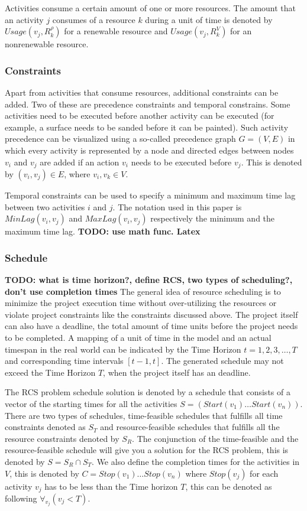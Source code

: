 \documentclass{article}
\newcommand{\TODO}[1]{{\color{red}\textbf{TODO: #1}}}
\begin{document}
Activities consume a certain amount of one or more resources.
The amount that an activity $j$ consumes of a resource $k$ during a unit of time is denoted by $Usage(v_j, R^{\rho}_k)$ for a renewable resource and   $Usage(v_j, R^V_k)$ for an nonrenewable resource.


\subsubsection{Constraints}
Apart from activities that consume resources, additional constraints can be added.
Two of these are precedence constraints and temporal constrains.
Some activities need to be executed before another activity can be executed (for example, a surface needs to be sanded before it can be painted).
Such activity precedence can be visualized using a so-called precedence graph $G = (V, E)$ in which every activity is represented by a node and directed edges between nodes $v_i$ and $v_j$ are added if an action $v_i$ needs to be executed before $v_j$.
This is denoted by $(v_i,v_j) \in E$, where $v_i, v_k \in V$.

Temporal constraints can be used to specify a minimum and maximum time lag between two activities $i$ and $j$.
The notation used in this paper is $MinLag(v_i, v_j)$ and $MaxLag(v_i, v_j)$ respectively the minimum and the maximum time lag.
\TODO{use math func. Latex}

\subsubsection{Schedule}
\TODO{what is time horizon?, define RCS, two types of scheduling?, don't use completion times}
The general idea of resource scheduling is to minimize the project execution time without over-utilizing the resources or violate project constraints like the constraints discussed above.
The project itself can also have a deadline, the total amount of time units before the project needs to be completed.
A mapping of a unit of time in the model and an actual timespan in the real world can be indicated by the Time Horizon $t=1,2,3,\ldots,T$ and corresponding time intervals $[t-1,t]$.
The generated schedule may not exceed the Time Horizon $T$, when the project itself has an deadline.

The RCS problem schedule solution is denoted by a schedule that consists of a vector of the starting times for all the activities $S =  (Start(v_1) \ldots Start(v_n))$.
There are two types of schedules, time-feasible schedules that fulfills all time constraints denoted as $S_T$ and resource-feasible schedules that fulfills all the resource constraints denoted by $S_R$.
The conjunction of the time-feasible and the resource-feasible schedule will give you a solution for the RCS problem, this is denoted by $S = S_R \cap S_T$.
We also define the completion times for the activities in $V$, this is denoted by $C = Stop(v_1) \ldots Stop(v_n)$ where $Stop(v_j)$ for each activity $v_j$ has to be less than the Time horizon $T$, this can be denoted as following $\forall_{v_j}(v_j < T)$.
\end{document}
